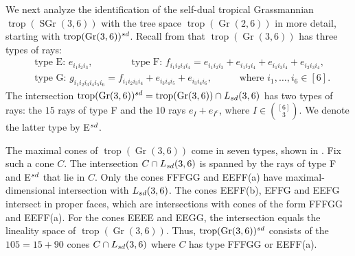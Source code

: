 \documentclass[12pt]{extarticle}
\theoremstyle{definition}
\numberwithin{theorem}{section}
\theoremstyle{plain}\newtheorem{ithm}{Theorem}
\DeclareMathOperator{\trop}{trop}
\DeclareMathOperator{\SGr}{SGr}
\DeclareMathOperator{\Gr}{Gr}
\begin{document}
  We next analyze the identification of the  self-dual tropical Grassmannian $\trop(\SGr(3,6))$ 
  with the tree space $\trop(\Gr(2,6))$ in more detail, starting with
  $\trop(\text{Gr}(3,6))^{\rm sd}$.
    Recall from \cite[Example 4.4.10]{MS}
  that $\trop(\Gr(3,6))$ has three types of rays:
    \begin{align*}
      &\text{type E:} \,\, e_{i_1i_2i_3}, \qquad  \qquad
      \text{type F:} \,\, f_{i_1i_2i_3i_4} = e_{i_1i_2i_3}+e_{i_1i_2i_4}+e_{i_1i_3i_4}+e_{i_2i_3i_4},\\
      &\text{type G:} \,\, g_{i_1i_2i_3i_4i_5i_6} = f_{i_1i_2i_3i_4} + e_{i_3i_4i_5}  + e_{i_3i_4i_6}, \,\,\, 
      \qquad \text{ where } i_1,\ldots,i_6 \in [6].
    \end{align*}
The intersection $\trop(\text{Gr}(3,6))^{\rm sd} = \trop(\Gr(3,6))  \cap L_{\rm sd}(3,6) $ has
  two types of rays: the $15$ rays of type F and the $10$ rays
 $e_{I}+e_{I^c}$, where $I \in \binom{[6]}{3}$. We denote the latter type by   E$^{\rm sd}$. 

The maximal cones of  $\trop(\Gr(3,6))$ come in seven types, 
shown in \cite[Figure 5.4.1]{MS}. Fix such a cone $C$.
The intersection $C \cap L_{\rm sd}(3,6)$
is spanned by the rays of type F and E$^{\rm sd}$ that lie in $C$. 
Only the cones FFFGG and EEFF(a) have maximal-dimensional intersection with $L_{\rm sd}(3,6)$.
The cones EEFF(b), EFFG and EEFG intersect in proper faces, which are intersections with cones of the form FFFGG and EEFF(a). 
For the  cones  EEEE and EEGG, the intersection equals the lineality space of $\trop(\Gr(3,6))$.
Thus, $\trop(\text{Gr}(3,6))^{\rm sd}$ consists of the $105 = 15+90$ cones
$C \cap L_{\rm sd}(3,6)$ where $C$ has type FFFGG or EEFF(a).
    
\end{document}
